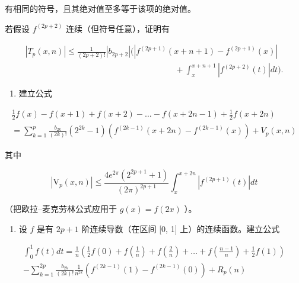 有相同的符号，且其绝对值至多等于该项的绝对值。

若假设 \(f^{(2p+2)}\) 连续（但符号任意），证明有

\[
\begin{array}{c} \left| T _ {p} (x, n) \right| \leqslant \frac {1}{(2 p + 2) !} \left| b _ {2 p + 2} \right| \Bigg (\left| f ^ {(2 p + 1)} (x + n + 1) - f ^ {(2 p + 1)} (x) \right| \\ \qquad \qquad \qquad \qquad \qquad \qquad \qquad \qquad \qquad + \int_ {x} ^ {x + n + 1} \left| f ^ {(2 p + 2)} (t) \right| d t \Bigg). \end{array}
\]

\begin{enumerate}
\def\labelenumi{\arabic{enumi})}
\setcounter{enumi}{1}
\tightlist
\item
  建立公式
\end{enumerate}

\[
\begin{array}{l} \frac {1}{2} f (x) - f (x + 1) + f (x + 2) - \dots - f (x + 2 n - 1) + \frac {1}{2} f (x + 2 n) \\ = \sum_ {k = 1} ^ {p} \frac {b _ {2 k}}{(2 k) !} (2 ^ {2 k} - 1) (f ^ {(2 k - 1)} (x + 2 n) - f ^ {(2 k - 1)} (x)) + V _ {p} (x, n) \end{array}
\]

其中

\[
\left| \mathrm{V} _ {p} (x, n) \right| \leqslant \frac {4 e ^ {2 \pi} \left(2 ^ {2 p + 1} + 1\right)}{(2 \pi) ^ {2 p + 1}} \int_ {x} ^ {x + 2 n} \left| f ^ {(2 p + 1)} (t) \right| d t
\]

（把欧拉–麦克劳林公式应用于 \(g(x) = f(2x)\) ）。

\begin{enumerate}
\def\labelenumi{\arabic{enumi})}
\setcounter{enumi}{2}
\tightlist
\item
  设 \(f\) 是有 \(2p + 1\) 阶连续导数（在区间 {[}0, 1{]} 上）的连续函数。建立公式
\end{enumerate}

\[
\begin{array}{l} \int_ {0} ^ {1} f (t) d t = \frac {1}{n} \left(\frac {1}{2} f (0) + f \left(\frac {1}{n}\right) + f \left(\frac {2}{n}\right) + \dots + f \left(\frac {n - 1}{n}\right) + \frac {1}{2} f (1)\right) \\ - \sum_ {k = 1} ^ {2 p} \frac {b _ {2 k}}{(2 k) !} \frac {1}{n ^ {2 k}} (f ^ {(2 k - 1)} (1) - f ^ {(2 k - 1)} (0)) + R _ {p} (n) \end{array}
\]

